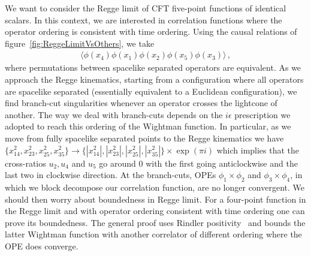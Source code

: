 We want to consider the Regge limit of CFT five-point functions of identical scalars.
In this context, we are interested in correlation functions where the operator ordering is consistent with time ordering. Using the causal relations of figure~\ref{fig:ReggeLimitVsOthers}, we take
\begin{align}
  \langle\phi(x_4)\phi(x_1)\phi(x_2)\phi(x_5)\phi(x_3)\rangle\,,
\end{align}
where permutations between spacelike separated operators are equivalent. As we approach the Regge kinematics, starting from a configuration where all operators are spacelike separated (essentially equivalent to a Euclidean configuration), we find branch-cut singularities whenever an operator crosses the lightcone of another. The way we deal with branch-cuts depends on the $i \epsilon$ prescription we adopted to reach this ordering of the Wightman function. In particular, as we move from fully spacelike separated points to the Regge kinematics we have $\{x_{14}^2, x_{23}^2,x_{25}^2,x_{35}^2\}\to \{|x_{14}^2|, |x_{23}^2|,|x_{25}^2|,|x_{35}^2|\}\times \exp(\pi i)$ which implies that the cross-ratios $u_2, u_4$ and $u_5$ go around 0 with the first going anticlockwise and the last two in clockwise direction. At the branch-cuts, OPEs $\phi_1\times \phi_2$ and $\phi_3\times \phi_4$, in which we block decompose our correlation function, are no longer convergent. We should then worry about boundedness in Regge limit. For a four-point function in the Regge limit and with operator ordering consistent with time ordering one can prove its boundedness. The general proof uses Rindler positivity~\cite{Casini:2010bf,Caron-Huot:2017vep, Maldacena:2015waa,Kologlu:2019bco} and bounds the latter Wightman function with another correlator of different ordering where the OPE does converge.
